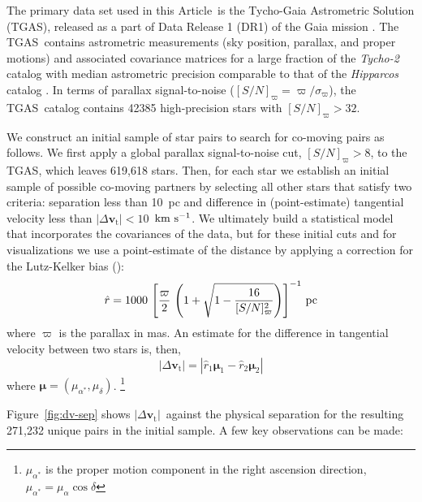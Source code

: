 \documentclass[manuscript, letterpaper]{aastex6}
\newcommand{\project}[1]{\textsl{#1}}
\newcommand{\acronym}[1]{{\small{#1}}}
\newcommand{\documentname}{Article}
\newcommand{\dr}{\acronym{DR1}}
\newcommand{\tgas}{\acronym{TGAS}}
\newcommand{\bs}[1]{\boldsymbol{#1}}
\renewcommand{\vec}[1]{\bs{#1}}
\newcommand{\kms}{\ensuremath{\rm km~s^{-1}}}
\newcommand{\snr}{[S/N]_\varpi}
\newcommand{\absdvtan}{\ensuremath{|\Delta\vec v_\mathrm{t}|}}
\begin{document}
The primary data set used in this \documentname\ is the Tycho-Gaia Astrometric
Solution (\tgas), released as a part of Data Release 1 (\dr) of the Gaia mission
\citep{Gaia-Collaboration:2016aa,Lindegren:2016aa}.
The \tgas\ contains astrometric measurements (sky position,
parallax, and proper motions) and associated covariance matrices for a large
fraction of the \project{Tycho-2} catalog \citep{2000A&A...355L..27H} with median
astrometric precision comparable to that of the \project{Hipparcos} catalog
\citep[$\approx 0.3~{\rm mas}$;][]{2007ASSL..350.....V}. In terms of parallax
signal-to-noise ($\snr = \varpi/\sigma_\varpi$), the \tgas\ catalog contains
42385 high-precision stars with $\snr > 32$.

We construct an initial sample of star pairs to search for co-moving pairs as
follows.
We first apply a global parallax signal-to-noise cut, $\snr > 8$,  to the \tgas,
which leaves 619,618 stars.
Then, for each star we establish an initial sample of possible
co-moving partners by selecting all other stars that satisfy two criteria:
separation less than 10~pc and difference
in (point-estimate) tangential velocity less than $\absdvtan < 10$~\kms.
We ultimately build a statistical model that incorporates the covariances of the
data, but for these initial cuts and for visualizations we use a point-estimate
of the distance by applying a correction for the Lutz-Kelker bias
(\citealt{Lutz:1973aa}):
\begin{equation}
  \hat{r} = 1000 \, \left[\frac{\varpi}{2} \,
    \left(1 + \sqrt{1 - \frac{16}{\snr^2}} \right) \right]^{-1} \, {\rm pc}
    \label{eq:dist}
\end{equation}
where $\varpi$ is the parallax in mas.
An estimate for the difference in tangential velocity between two stars is,
then,
\begin{equation}
  \absdvtan = |\hat{r}_1 \vec\mu_1 - \hat{r}_2 \vec\mu_2|
\end{equation}
where $\vec\mu = (\mu_{\alpha^*}, \mu_\delta)$.
\footnote{$\mu_{\alpha^*}$ is the proper motion component
in the right ascension direction, $\mu_{\alpha^*} = \mu_\alpha \cos\delta$}

Figure~\ref{fig:dv-sep} shows \absdvtan\ against the physical separation
for the resulting 271,232 unique pairs in the initial sample.
A few key observations can be made:
\end{document}
